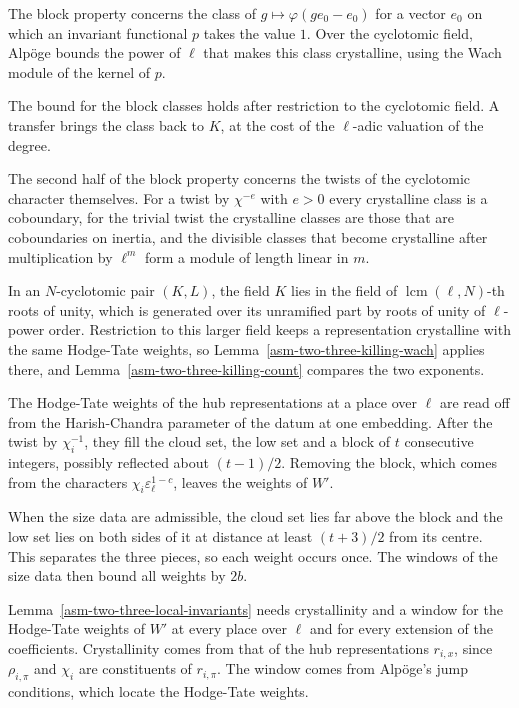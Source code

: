 The block property concerns the class of $g\mapsto\varphi(ge_0-e_0)$ for a
vector $e_0$ on which an invariant functional $p$ takes the value $1$. Over the
cyclotomic field, Alpöge bounds the power of $\ell$ that makes this class
crystalline, using the Wach module of the kernel of $p$.

The bound for the block classes holds after restriction to the cyclotomic
field. A transfer brings the class back to $K$, at the cost of the
$\ell$-adic valuation of the degree.

The second half of the block property concerns the twists of the cyclotomic
character themselves. For a twist by $\chi^{-e}$ with $e>0$ every crystalline
class is a coboundary, for the trivial twist the crystalline classes are those
that are coboundaries on inertia, and the divisible classes that become
crystalline after multiplication by $\ell^m$ form a module of length linear in
$m$.

In an $N$-cyclotomic pair $(K,L)$, the field $K$ lies in the field of
$\operatorname{lcm}(\ell,N)$-th roots of unity, which is generated over its
unramified part by roots of unity of $\ell$-power order. Restriction to this
larger field keeps a representation crystalline with the same Hodge-Tate
weights, so Lemma~\ref{asm-two-three-killing-wach} applies there, and
Lemma~\ref{asm-two-three-killing-count} compares the two exponents.

The Hodge-Tate weights of the hub representations at a place over $\ell$ are
read off from the Harish-Chandra parameter of the datum at one embedding. After
the twist by $\chi_i^{-1}$, they fill the cloud set, the low set and a block of
$t$ consecutive integers, possibly reflected about $(t-1)/2$. Removing the
block, which comes from the characters $\chi_i\varepsilon_\ell^{1-c}$, leaves the
weights of $W'$.

When the size data are admissible, the cloud set lies far above the block and
the low set lies on both sides of it at distance at least $(t+3)/2$ from its
centre. This separates the three pieces, so each weight occurs once. The windows
of the size data then bound all weights by $2b$.

Lemma~\ref{asm-two-three-local-invariants} needs crystallinity and a window
for the Hodge-Tate weights of $W'$ at every place over $\ell$ and for every
extension of the coefficients. Crystallinity comes from that of the hub
representations $r_{i,x}$, since $\rho_{i,\pi}$ and $\chi_i$ are constituents
of $r_{i,\pi}$. The window comes from Alpöge's jump conditions, which locate
the Hodge-Tate weights.

